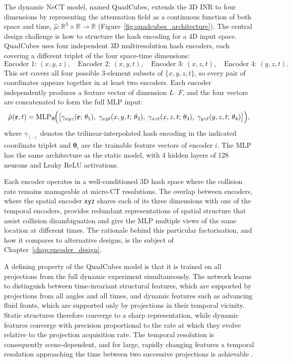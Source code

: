 \documentclass[12pt, a4paper, twoside]{report}
\newcommand{\muhat}{\hat{\mu}}
\begin{document}
The dynamic NeCT model, named QuadCubes, extends the 3D INR to four dimensions by representing the attenuation field as a continuous function of both space and time, $\muhat : \mathbb{R}^3 \times \mathbb{R} \to \mathbb{R}$ (Figure~\ref{fig:quadcubes_architecture}). The central design challenge is how to structure the hash encoding for a 4D input space. QuadCubes uses four independent 3D multiresolution hash encoders, each covering a different triplet of the four space-time dimensions:
%
\begin{equation}
    \text{Encoder 1: } (x, y, z), \quad
    \text{Encoder 2: } (x, y, t), \quad
    \text{Encoder 3: } (x, z, t), \quad
    \text{Encoder 4: } (y, z, t).
    \label{eq:quadcubes_encoders}
\end{equation}
%
This set covers all four possible 3-element subsets of $\{x, y, z, t\}$, so every pair of coordinates appears together in at least two encoders. Each encoder independently produces a feature vector of dimension $L \cdot F$, and the four vectors are concatenated to form the full MLP input:
%
\begin{equation}
    \muhat(\mathbf{r}, t) = \mathrm{MLP}_\Phi\!\Bigl(
        \bigl[
            \gamma_{xyz}(\mathbf{r};\,\theta_1),\;
            \gamma_{xyt}(x,y,t;\,\theta_2),\;
            \gamma_{xzt}(x,z,t;\,\theta_3),\;
            \gamma_{yzt}(y,z,t;\,\theta_4)
        \bigr]
    \Bigr),
    \label{eq:quadcubes_forward}
\end{equation}
%
where $\gamma_{(\cdot)}$ denotes the trilinear-interpolated hash encoding in the indicated coordinate triplet and $\boldsymbol{\theta}_i$ are the trainable feature vectors of encoder $i$. The MLP has the same architecture as the static model, with 4 hidden layers of 128 neurons and Leaky ReLU activations.

Each encoder operates in a well-conditioned 3D hash space where the collision rate remains manageable at micro-CT resolutions. The overlap between encoders, where the spatial encoder \texttt{xyz} shares each of its three dimensions with one of the temporal encoders, provides redundant representations of spatial structure that assist collision disambiguation and give the MLP multiple views of the same location at different times. The rationale behind this particular factorisation, and how it compares to alternative designs, is the subject of Chapter~\ref{chap:encoder_design}.

A defining property of the QuadCubes model is that it is trained on all projections from the full dynamic experiment simultaneously. The network learns to distinguish between time-invariant structural features, which are supported by projections from all angles and all times, and dynamic features such as advancing fluid fronts, which are supported only by projections in their temporal vicinity. Static structures therefore converge to a sharp representation, while dynamic features converge with precision proportional to the rate at which they evolve relative to the projection acquisition rate. The temporal resolution is consequently scene-dependent, and for large, rapidly changing features a temporal resolution approaching the time between two successive projections is achievable \citep{friis2025nect}.
\end{document}
